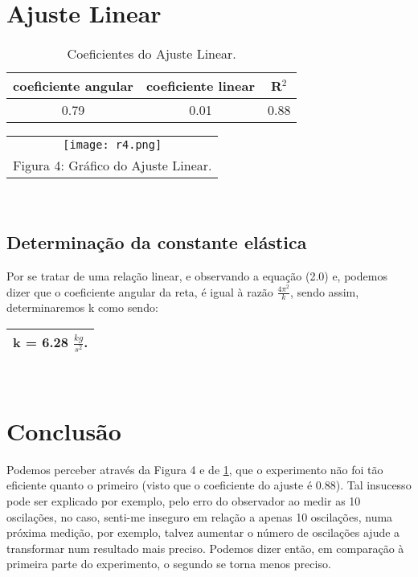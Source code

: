 \documentclass[11pt, article]{abntex2}
\begin{document}
\section{Ajuste Linear}
\begin{table}[!ht]
    \centering
    \begin{tabular}{|c|c|c|}
     \hline
     coeficiente angular & coeficiente linear & R$^{2}$  \\
     \hline
        0.79 & 0.01 & 0.88 \\
        \hline
    \end{tabular}
    \caption{Coeficientes do Ajuste Linear.}
    \label{tab:2}
\end{table}
\begin{table}[!ht]
    \centering
    \begin{tabular}{c}
         \texttt{[image: r4.png]} \\
          Figura 4: Gráfico do Ajuste Linear.
    \end{tabular}
    \label{fig4}
\end{table}
\\
\newpage
\subsection{Determinação da constante elástica}
Por se tratar de uma relação linear, e observando a equação (2.0) e, podemos dizer que o coeficiente angular da reta, é igual à razão $\frac{4\pi^{2}}{k}$, sendo assim, determinaremos k como sendo:
\begin{table}[!ht]
    \centering
    \begin{tabular}{|c|}
         \hline
         k = 6.28 $\frac{kg}{s^{2}}$.\\
           \hline
    \end{tabular}
    \label{fig4}
\end{table}
\\
\section{Conclusão}
Podemos perceber através da Figura 4 e de \ref{tab:2}, que o experimento não foi tão eficiente quanto o primeiro (visto que o coeficiente do ajuste é 0.88). Tal insucesso pode ser explicado por exemplo, pelo erro do observador ao medir as 10 oscilações, no caso, senti-me inseguro em relação a apenas 10 oscilações, numa próxima medição, por exemplo, talvez aumentar o número de oscilações ajude a transformar num resultado mais preciso. Podemos dizer então, em comparação à primeira parte do experimento, o segundo se torna menos preciso. 
\end{document}
